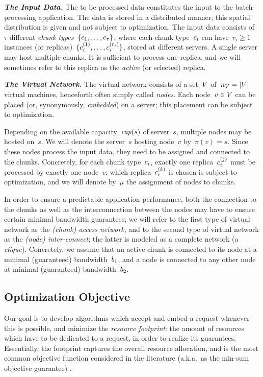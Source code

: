 \textbf{\emph{The Input Data.}} The to be processed data constitutes the input to the batch-processing application.
The data is stored in a distributed manner; this spatial distribution is given and not subject to optimization.
The input data consists of~$\tau$ different \emph{chunk types}~$\{c_1, \ldots, c_{\tau}\}$,
where each chunk type~$c_i$ can have~$r_i\geq 1$ instances (or replicas)~$\{c_{i}^{(1)},\ldots, c_{i}^{(r_i)}\}$,
 stored at different servers. A single server may host multiple chunks.
It is sufficient to process one replica, and we will sometimes refer to this
replica as the \emph{active} (or selected) replica.

\textbf{\emph{The Virtual Network.}} The virtual network consists of a set~$V$ of~$n_V=|V|$ virtual machines,
henceforth often simply called \emph{nodes}.
Each node~$v \in V$ can be placed (or, synonymously, \emph{embedded}) on a server; this placement can be subject
to optimization.

Depending on the available capacity~$\emph{cap}(s)$ of server~$s$, multiple nodes may be hosted on~$s$.
We will denote the server~$s$ hosting node~$v$ by~$\pi(v)=s$.
Since these nodes process the input data, they need to be assigned and connected to the
chunks. Concretely, for each chunk type~$c_i$, exactly one
replica~$c_{i}^{(j)}$ must be processed by exactly one node~$v$;
which replica~$c_{i}^{(k)}$ is chosen is subject to optimization, and
we will denote by~$\mu$ the assignment of nodes to chunks.

In order to ensure a predictable application performance, both the connection to the chunks
as well as the interconnection between the nodes may have to ensure certain
minimal bandwidth guarantees; we will refer to the first type of virtual network as the \emph{(chunk) access
network}, and to the second type of virtual network as the \emph{(node) inter-connect}; the latter
is modeled as a complete network (a \emph{clique}). Concretely, we assume that an  active chunk
is connected to its node at a minimal (guaranteed) bandwidth~$b_1$, and a node is connected to any other node
at minimal (guaranteed) bandwidth~$b_2$.

\subsection{Optimization Objective}

Our goal is to develop algorithms which 
accept and embed a request
whenever this is possible, and minimize the \emph{resource footprint}: the amount of resources which have to be dedicated to a request, in order to realize its guarantees.
Essentially, the footprint captures the overall resource allocation, and is the most common objective function considered in the literature (a.k.a.~as the min-sum objective guarantee)
\cite{fischer-survey}.


